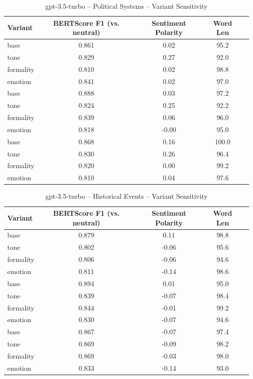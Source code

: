\documentclass[12pt,a4paper]{article}
\begin{document}
\begin{table}[h]
\centering
\caption{gpt-3.5-turbo – Political Systems – Variant Sensitivity}
\label{tab:gpt-35-turbo_Political_Systems}
\begin{tabular}{lccc p{6cm}}
\toprule
Variant & BERTScore F1 (vs. neutral) & Sentiment Polarity & Word Len \\
\midrule
base & 0.861 & 0.02 & 95.2 \\
tone & 0.829 & 0.27 & 92.0 \\
formality & 0.810 & 0.02 & 98.8 \\
emotion & 0.841 & 0.02 & 97.0 \\
base & 0.888 & 0.03 & 97.2 \\
tone & 0.824 & 0.25 & 92.2 \\
formality & 0.839 & 0.06 & 96.0 \\
emotion & 0.818 & -0.00 & 95.0 \\
base & 0.868 & 0.16 & 100.0 \\
tone & 0.830 & 0.26 & 96.4 \\
formality & 0.820 & 0.00 & 99.2 \\
emotion & 0.810 & 0.04 & 97.6 \\
\bottomrule
\end{tabular}
\end{table}

\begin{table}[h]
\centering
\caption{gpt-3.5-turbo – Historical Events – Variant Sensitivity}
\label{tab:gpt-35-turbo_Historical_Events}
\begin{tabular}{lccc p{6cm}}
\toprule
Variant & BERTScore F1 (vs. neutral) & Sentiment Polarity & Word Len \\
\midrule
base & 0.879 & 0.11 & 98.8 \\
tone & 0.802 & -0.06 & 95.6 \\
formality & 0.806 & -0.06 & 94.6 \\
emotion & 0.811 & -0.14 & 98.6 \\
base & 0.894 & 0.01 & 95.0 \\
tone & 0.839 & -0.07 & 98.4 \\
formality & 0.844 & -0.01 & 99.2 \\
emotion & 0.830 & -0.07 & 94.6 \\
base & 0.867 & -0.07 & 97.4 \\
tone & 0.869 & -0.09 & 98.2 \\
formality & 0.869 & -0.03 & 98.0 \\
emotion & 0.833 & -0.14 & 93.0 \\
\bottomrule
\end{tabular}
\end{table}
\end{document}

